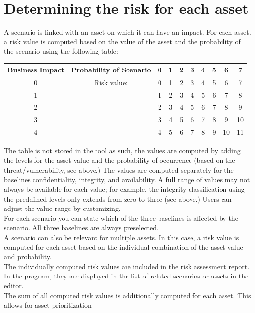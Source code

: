 \documentclass[a4paper,10pt]{book}
\begin{document}
\section{Determining the risk for each asset}
A scenario is linked with an asset on which it can have an impact. For each asset, a risk value is computed
based on the value of the asset and the probability of the scenario using the following table:
\begin{longtable}{|c||c|c|c|c|c|c|c|c|c|}
\hline
Business Impact & Probability of Scenario & 0 & 1 & 2 & 3 & 4 & 5 & 6 & 7 \\[10pt] \hline\hline
0 & Risk value: & 0 & 1 & 2 & 3 & 4 & 5 & 6 & 7  \\[10pt] \hline
1 &  & 1 & 2 & 3 & 4 & 5 & 6 & 7 & 8  \\[10pt] \hline
2 &  & 2 & 3 & 4 & 5 & 6 & 7 & 8 & 9  \\[10pt] \hline
3 &  & 3 & 4 & 5 & 6 & 7 & 8 & 9 & 10  \\[10pt] \hline
4 &  & 4 & 5 & 6 & 7 & 8 & 9 & 10 & 11  \\[10pt] \hline
\end{longtable}
The table is not stored in the tool as such, the values are computed by adding the levels for the asset value
and the probability of occurrence (based on the threat/vulnerability, see above.) The values are computed
separately for the baselines confidentiality, integrity, and availability. A full range of values may not
always be available for each value; for example, the integrity classification using the predefined levels
only extends from zero to three (see above.) Users can adjust the value range by customizing.
\newline\\
For each scenario you can state which of the three baselines is affected by the scenario. All three baselines
are always preselected.
\newline\\
A scenario can also be relevant for multiple assets. In this case, a risk value is computed for each asset
based on the individual combination of the asset value and probability.
\newline\\
The individually computed risk values are included in the risk assessment report. In the program, they are
displayed in the list of related scenarios or assets in the editor.
\newline\\
The sum of all computed risk values is additionally computed for each asset. This allows for asset prioritization
\end{document}
